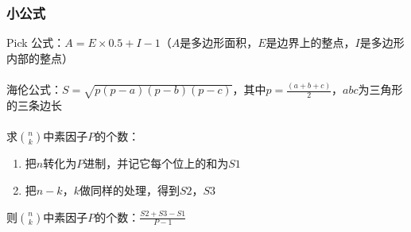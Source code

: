     \subsubsection{小公式}
    Pick 公式：$A = E\times 0.5+I-1$（$A$是多边形面积，$E$是边界上的整点，$I$是多边形内部的整点）\\
    \\
    海伦公式：$S = \sqrt{p(p-a)(p-b)(p-c)}$，其中$p = \frac{(a+b+c)}{2}$，$abc$为三角形的三条边长\\
    \\
    求$\binom{n}{k}$中素因子$P$的个数：\\
    \begin {enumerate}
	\item 把$n$转化为$P$进制，并记它每个位上的和为$S1$
	\item 把$n-k$，$k$做同样的处理，得到$S2$，$S3$
    \end{enumerate}
    则$\binom{n}{k}$中素因子$P$的个数：$\frac{S2+S3-S1}{P-1}$\\